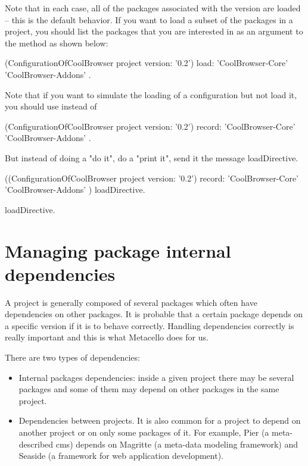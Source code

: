 \documentclass[a4paper,10pt,twoside]{book}
\begin{document}
Note that in each case, all of the packages associated with the version are loaded \--- this  
is the default behavior. If you want to load a subset of the packages in a project, you should list 
the packages that you are interested in as an argument to the  method as shown below:

\begin{code}{}
  (ConfigurationOfCoolBrowser project version: '0.2') load: { 'CoolBrowser-Core' 'CoolBrowser-Addons' }.
\end{code}


Note that if you want to simulate the loading of a configuration but not load it, you should use  instead of 

\begin{code}{}
  (ConfigurationOfCoolBrowser project version: '0.2') record: { 'CoolBrowser-Core' 'CoolBrowser-Addons' }.
\end{code}

But instead of doing a "do it", do a "print it", send it the message loadDirective.

\begin{code}{}
  ((ConfigurationOfCoolBrowser project version: '0.2') record: { 'CoolBrowser-Core' 'CoolBrowser-Addons' }) loadDirective.
\end{code} loadDirective.


\section{Managing package internal dependencies}

A project is generally composed of several packages which often have dependencies on other packages.  It is probable that a certain package depends on a specific version if it is to behave correctly. Handling dependencies correctly is really important and this is what Metacello does for us. 

There are two types of dependencies:
\begin{itemize}
\item Internal packages dependencies: inside a given project there may be several packages and some of them may depend on other packages in the same project. 
\item Dependencies between projects. It is also common for a project to depend on another project or on only some packages of it. For example, Pier (a meta-described cms) depends on Magritte (a meta-data modeling framework) and Seaside (a framework for web application development).
\end{itemize}
\end{document}
